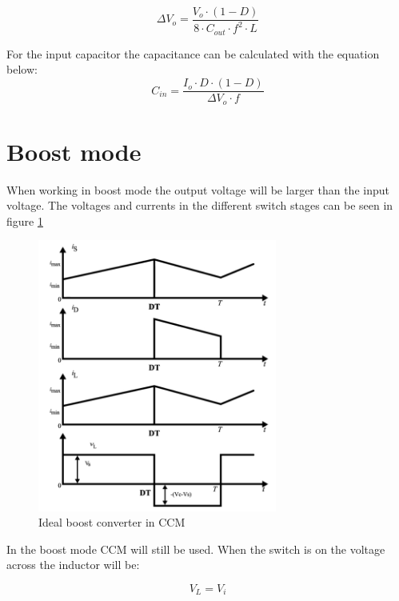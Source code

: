 \begin{equation} \label{buckc} 
\Delta V_o = \frac{V_{o}\cdot (1-D)}{8\cdot C_{out}\cdot f^2\cdot L}
\end{equation}  \cite{buck_equation}    

For the input capacitor the capacitance can be calculated with the equation below:
\begin{equation}
\label{buckcin}
C_{in} = \frac{I_o\cdot D\cdot (1-D)}{\Delta V_o\cdot f}
\end{equation} \cite{underthehood}  

\section{Boost mode}
When working in boost mode the output voltage will be larger than the input voltage. The voltages and currents in the different switch stages can be seen in figure \ref{CCM_boost}

\begin{figure}[htbp]
	\begin{center}
		\includegraphics[width=0.7\textwidth]{../Pictures/CCM_boost}
		\caption{Ideal boost converter in CCM \cite{CCM_boost}}
		\label{CCM_boost}
	\end{center}	
\end{figure}
In the boost mode CCM will still be used. When the switch is on the voltage across the inductor will be:

\begin{equation}
V_L = V_i
\end{equation}


